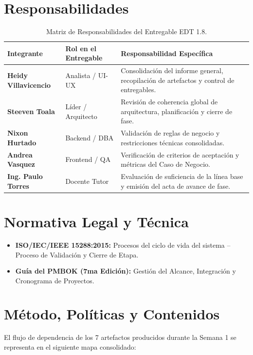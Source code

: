 \documentclass[12pt,a4paper]{article}
\begin{document}
\section{Responsabilidades}
\begin{table}[htbp]
\centering
\small
\begin{tabularx}{\textwidth}{|>{\hsize=0.65\hsize\bfseries}X|>{\hsize=0.85\hsize}X|>{\hsize=1.5\hsize}X|}
    \hline
    \rowcolor{tableheader}
    Integrante & Rol en el Entregable & Responsabilidad Específica \\
    \hline
    Heidy Villavicencio & Analista / UI-UX & Consolidación del informe general, recopilación de artefactos y control de entregables. \\
    \hline
    Steeven Toala & Líder / Arquitecto & Revisión de coherencia global de arquitectura, planificación y cierre de fase. \\
    \hline
    Nixon Hurtado & Backend / DBA & Validación de reglas de negocio y restricciones técnicas consolidadas. \\
    \hline
    Andrea Vasquez & Frontend / QA & Verificación de criterios de aceptación y métricas del Caso de Negocio. \\
    \hline
    Ing. Paulo Torres & Docente Tutor & Evaluación de suficiencia de la línea base y emisión del acta de avance de fase. \\
    \hline
\end{tabularx}
\caption{Matriz de Responsabilidades del Entregable EDT 1.8.}
\end{table}

\section{Normativa Legal y Técnica}
\begin{itemize}[leftmargin=1.5em, itemsep=2pt]
    \item \textbf{ISO/IEC/IEEE 15288:2015:} Procesos del ciclo de vida del sistema -- Proceso de Validación y Cierre de Etapa.
    \item \textbf{Guía del PMBOK (7ma Edición):} Gestión del Alcance, Integración y Cronograma de Proyectos.
\end{itemize}

\section{Método, Políticas y Contenidos}
El flujo de dependencia de los 7 artefactos producidos durante la Semana 1 se representa en el siguiente mapa consolidado:
\end{document}
